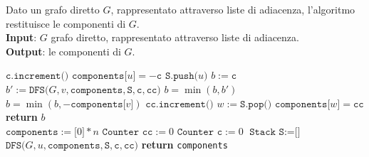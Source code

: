 \documentclass[a4paper, 12pt]{report}
\begin{document}
    \begin{algorithm}[H]
        \caption{
            Dato un grafo diretto $G$, rappresentato attraverso liste di adiacenza, l'algoritmo restituisce le componenti di $G$.\\
            \textbf{Input}: $G$ grafo diretto, rappresentato attraverso liste di adiacenza.\\
            \textbf{Output}: le componenti di $G$.
        }

        \begin{algorithmic}[1]
                \State $\texttt{c.increment()}$
                \State $\texttt{components[}u\texttt{]} = - \texttt{c}$ 
                \State $\texttt{S.push(}u\texttt{)}$
                \State $b := \texttt{c}$
                        \State $b' := \texttt{DFS(}G, v, \texttt{components}, \texttt{S}, \texttt{c}, \texttt{cc)}$
                        \State $b = \min(b, b')$
                        \State $b = \min(b, - \texttt{components[}v\texttt{]})$
                    \EndIf
                \EndFor
                 
                    \State $\texttt{cc.increment()}$
                    \Do
                        \State $w := \texttt{S.pop()}$
                        \State $\texttt{components[}w\texttt{]} = \texttt{cc}$
                \EndIf
                \State \textbf{return} $b$
            \EndFunction
            \\
                \State $\texttt{components} := \texttt{[}0\texttt{]} * n$
                \State $\texttt{Counter cc} := 0$
                \State $\texttt{Counter c} := 0$
                \State $\texttt{Stack S} := \texttt{[}\texttt{]}$
                        \State $\texttt{DFS(}G, u, \texttt{components}, \texttt{S}, \texttt{c}, \texttt{cc)}$
                    \EndIf
                \EndFor
                \State \textbf{return} \texttt{components}
            \EndFunction
        \end{algorithmic}
    \end{algorithm}
\end{document}
